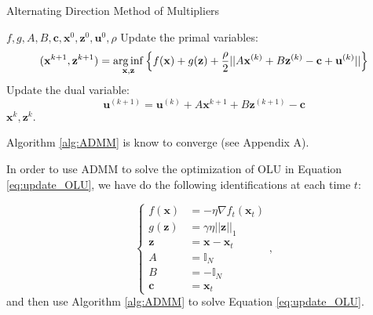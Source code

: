 \begin{algorithm}[!h]
    \caption{Alternating Direction Method of Multipliers}
    \label{alg:ADMM}
    \begin{algorithmic}[1]
    \REQUIRE $f,g,A,B,\mathbf c,\mathbf x^0,\mathbf z^0,\mathbf u^0,\rho$ \nonumber
    \STATE Update the primal variables: 
    $$(\mathbf x^{k+1},\mathbf z^{k+1})=\operatorname*{arg\,inf}\limits_{\mathbf x,\mathbf z }\left\{f(\mathbf x)+g(\mathbf z)+\frac{\rho}{2}||A\mathbf x^{(k)}+B\mathbf z^{(k)}-\mathbf c+\mathbf u^{(k)}||\right\}$$
    \STATE Update the dual variable: 
    $$\mathbf u^{(k+1)}=\mathbf u^{(k)}+A\mathbf x^{k+1}+B\mathbf z^{(k+1)}-\mathbf c$$
    \ENDWHILE
    \RETURN $\mathbf x^k,\mathbf z^k$. 
    \end{algorithmic}
\end{algorithm}

Algorithm \ref{alg:ADMM} is know to converge (see \cite{boyd2011distributed} Appendix A).

In order to use ADMM to solve the optimization of OLU in Equation \eqref{eq:update_OLU}, we have do the following identifications at each time $t$:

\begin{equation}
\begin{cases}
f(\mathbf x)&=-\eta\nabla f_t(\mathbf x_t)\\
g(\mathbf z)&=\gamma\eta||\mathbf z||_1 \\
\mathbf z&=\mathbf x-\mathbf x_t\\
A&=\mathbb I_N\\
B&=-\mathbb I_N\\
\mathbf c&=\mathbf x_t
\end{cases},
\end{equation}
and then use Algorithm \ref{alg:ADMM} to solve Equation \eqref{eq:update_OLU}.





